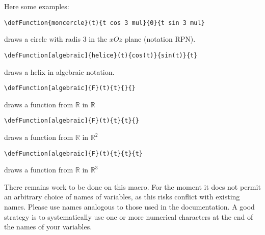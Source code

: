Here some examples:
\begin{compactitem}
\item \verb!\defFunction{moncercle}(t){t cos 3 mul}{0}{t sin 3 mul}!

    draws a circle with radis 3 in the $xOz$ plane (notation RPN).
    \item \verb!\defFunction[algebraic]{helice}(t){cos(t)}{sin(t)}{t}!

    draws a helix in algebraic notation.
    \item \verb!\defFunction[algebraic]{F}(t){t}{}{}!

    draws a function from $\mathbb{R}$ in $\mathbb{R}$
    \item \verb!\defFunction[algebraic]{F}(t){t}{t}{}!

    draws a function from $\mathbb{R}$ in $\mathbb{R}^2$
    \item \verb!\defFunction[algebraic]{F}(t){t}{t}{t}!

    draws a function from $\mathbb{R}$ in $\mathbb{R}^3$

\end{compactitem}

There remains work to be done on this macro.  For the moment it does not permit an arbitrary
choice of names of variables, as this risks conflict with existing names.  Please use
names analogous to those used in the documentation.  A good strategy is to systematically use
one or more numerical characters at the end of the names of your variables.

\endinput

